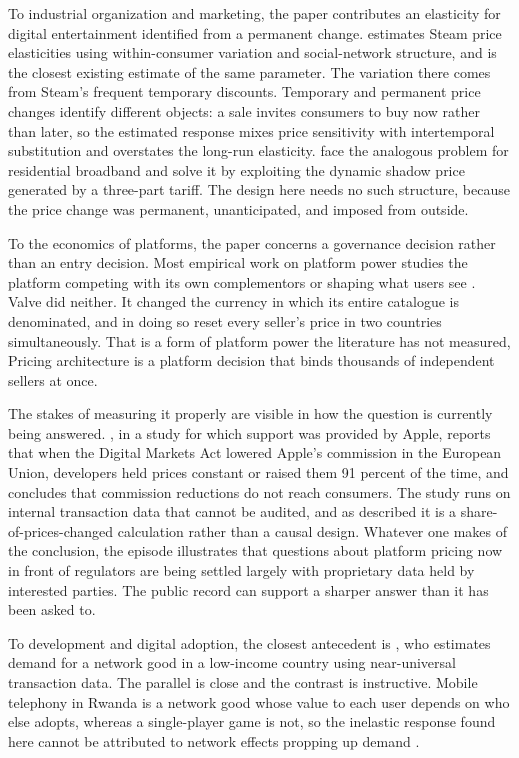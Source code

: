 \documentclass[11pt]{article}
\begin{document}
To industrial organization and marketing, the paper contributes an elasticity for digital
entertainment identified from a permanent change. \citet{tudon2022} estimates Steam price
elasticities using within-consumer variation and social-network structure, and is the closest
existing estimate of the same parameter. The variation there comes from Steam's frequent temporary
discounts. Temporary and permanent price changes identify different objects: a sale invites
consumers to buy now rather than later, so the estimated response mixes price sensitivity with
intertemporal substitution and overstates the long-run elasticity. \citet{nevo2016} face the
analogous problem for residential broadband and solve it by exploiting the dynamic shadow price
generated by a three-part tariff. The design here needs no such structure, because the price change
was permanent, unanticipated, and imposed from outside.

To the economics of platforms, the paper concerns a governance decision rather than an entry
decision. Most empirical work on platform power studies the platform competing with its own
complementors \citep{zhu2018,wen2019} or shaping what users see \citep{fleder2009,tadelis2016}.
Valve did neither. It changed the currency in which its entire catalogue is denominated, and in
doing so reset every seller's price in two countries simultaneously. That is a form of platform
power the literature has not measured, Pricing architecture is a platform decision
that binds thousands of independent sellers at once.

The stakes of measuring it properly are visible in how the question is currently being answered.
\citet{choi2025}, in a study for which support was provided by Apple, reports that when the
Digital Markets Act lowered Apple's commission in the European Union, developers held prices
constant or raised them 91 percent of the time, and concludes that commission reductions do not
reach consumers. The study runs on internal transaction data that cannot be audited, and as
described it is a share-of-prices-changed calculation rather than a causal design. Whatever one
makes of the conclusion, the episode illustrates that questions about platform pricing now in
front of regulators are being settled largely with proprietary data held by interested parties.
The public record can support a sharper answer than it has been asked to.

To development and digital adoption, the closest antecedent is \citet{bjorkegren2019}, who
estimates demand for a network good in a low-income country using near-universal transaction data.
The parallel is close and the contrast is instructive. Mobile telephony in Rwanda is a network good
whose value to each user depends on who else adopts, whereas a single-player game is not, so the
inelastic response found here cannot be attributed to network effects propping up demand
\citep{katz1985}.
\end{document}

